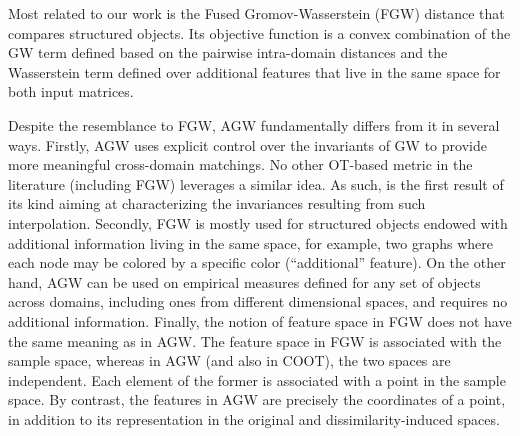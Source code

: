 Most related to our work is the Fused Gromov-Wasserstein (FGW) distance \citep{Vayer19b}
that compares structured objects. Its objective function is a convex combination of
the GW term defined based on the pairwise intra-domain distances and the Wasserstein term
defined over additional features that live in the same space for both input matrices.

Despite the resemblance to FGW, AGW fundamentally differs from it in several ways.
Firstly, AGW uses explicit control over the invariants of GW to provide more meaningful
cross-domain matchings. No other OT-based metric in the literature (including FGW)
leverages a similar idea. As such,  is the first result of its kind
aiming at characterizing the invariances resulting from such interpolation. Secondly,
FGW is mostly used for structured objects endowed with additional information living
in the same space, for example, two graphs where each node may be colored by
a specific color (``additional'' feature). On the other hand, AGW can be used on
empirical measures defined for any set of objects across domains, including ones
from different dimensional spaces, and requires no additional information. Finally,
the notion of feature space in FGW does not have the same meaning as in AGW.
The feature space in FGW is associated with the sample space, whereas in AGW (and also in COOT),
the two spaces are independent. Each element of the former is
associated with a point in the sample space. By contrast, the features in AGW are
precisely the coordinates of a point, in addition to its representation in the
original and dissimilarity-induced spaces.



